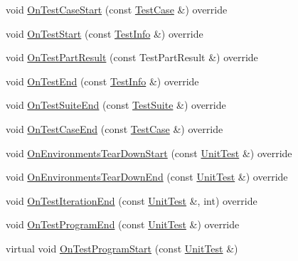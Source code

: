 \begin{DoxyCompactItemize}
void \mbox{\hyperlink{classtesting_1_1_empty_test_event_listener_a7f9a84967fde01000b7a56e9e84b6052}{On\+Test\+Case\+Start}} (const \mbox{\hyperlink{classtesting_1_1_test_case}{Test\+Case}} \&) override
\item 
void \mbox{\hyperlink{classtesting_1_1_empty_test_event_listener_a1d8c7f3f1f92826f668edae1bc5aadf4}{On\+Test\+Start}} (const \mbox{\hyperlink{classtesting_1_1_test_info}{Test\+Info}} \&) override
\item 
void \mbox{\hyperlink{classtesting_1_1_empty_test_event_listener_ab95992f0a0b3741d59a24c3a7115fa60}{On\+Test\+Part\+Result}} (const Test\+Part\+Result \&) override
\item 
void \mbox{\hyperlink{classtesting_1_1_empty_test_event_listener_a709d7077c086c877d214231bc520ef90}{On\+Test\+End}} (const \mbox{\hyperlink{classtesting_1_1_test_info}{Test\+Info}} \&) override
\item 
void \mbox{\hyperlink{classtesting_1_1_empty_test_event_listener_aefdb73682d290791461e186d864db718}{On\+Test\+Suite\+End}} (const \mbox{\hyperlink{classtesting_1_1_test_suite}{Test\+Suite}} \&) override
\item 
void \mbox{\hyperlink{classtesting_1_1_empty_test_event_listener_abe05cc74c1081ed51e2c84b73013299e}{On\+Test\+Case\+End}} (const \mbox{\hyperlink{classtesting_1_1_test_case}{Test\+Case}} \&) override
\item 
void \mbox{\hyperlink{classtesting_1_1_empty_test_event_listener_a320780451eac9178434b7c77d948ecbd}{On\+Environments\+Tear\+Down\+Start}} (const \mbox{\hyperlink{classtesting_1_1_unit_test}{Unit\+Test}} \&) override
\item 
void \mbox{\hyperlink{classtesting_1_1_empty_test_event_listener_ad9984052e82c3ae26395a2d9480326d2}{On\+Environments\+Tear\+Down\+End}} (const \mbox{\hyperlink{classtesting_1_1_unit_test}{Unit\+Test}} \&) override
\item 
void \mbox{\hyperlink{classtesting_1_1_empty_test_event_listener_aae9c5c61e476f0c421402fb1dde434d2}{On\+Test\+Iteration\+End}} (const \mbox{\hyperlink{classtesting_1_1_unit_test}{Unit\+Test}} \&, int) override
\item 
void \mbox{\hyperlink{classtesting_1_1_empty_test_event_listener_aaa9d683e8e0c850af67a0b92d785ddb9}{On\+Test\+Program\+End}} (const \mbox{\hyperlink{classtesting_1_1_unit_test}{Unit\+Test}} \&) override
\item 
virtual void \mbox{\hyperlink{classtesting_1_1_empty_test_event_listener_aa3847c8a3c22d8d69a6006dfdd6589fc}{On\+Test\+Program\+Start}} (const \mbox{\hyperlink{classtesting_1_1_unit_test}{Unit\+Test}} \&)

\end{DoxyCompactItemize}
